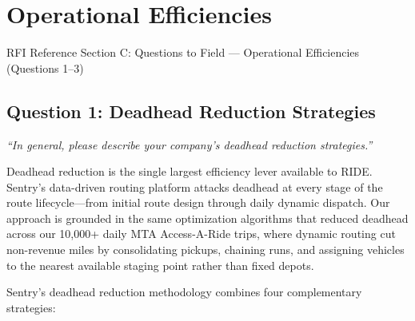 \section{\texorpdfstring{\color{MidnightBlue}Operational Efficiencies}{Operational Efficiencies}}

\begin{sidebar}{RFI Reference}
Section C: Questions to Field --- Operational Efficiencies (Questions 1--3)
\end{sidebar}

\subsection{Question 1: Deadhead Reduction Strategies}
\textit{``In general, please describe your company's deadhead reduction strategies.''}

\vspace{0.3cm}

Deadhead reduction is the single largest efficiency lever available to RIDE. Sentry's data-driven routing platform attacks deadhead at every stage of the route lifecycle---from initial route design through daily dynamic dispatch. Our approach is grounded in the same optimization algorithms that reduced deadhead across our 10,000+ daily MTA Access-A-Ride trips, where dynamic routing cut non-revenue miles by consolidating pickups, chaining runs, and assigning vehicles to the nearest available staging point rather than fixed depots.

\vspace{0.3cm}


\vspace{0.3cm}

Sentry's deadhead reduction methodology combines four complementary strategies:

